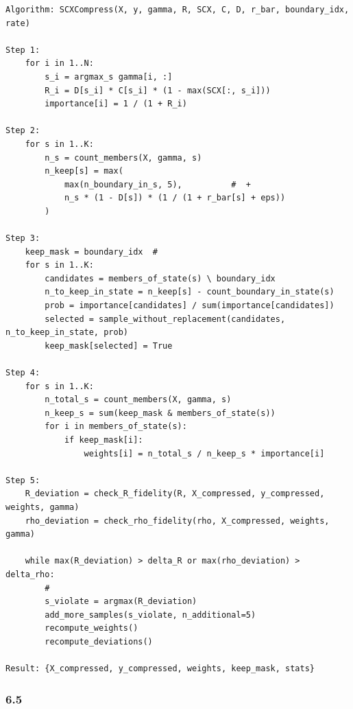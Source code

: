 \documentclass[
  12pt,
]{article}
\begin{document}
\begin{verbatim}
Algorithm: SCXCompress(X, y, gamma, R, SCX, C, D, r_bar, boundary_idx, rate)

Step 1: 
    for i in 1..N:
        s_i = argmax_s gamma[i, :]
        R_i = D[s_i] * C[s_i] * (1 - max(SCX[:, s_i]))
        importance[i] = 1 / (1 + R_i)

Step 2: 
    for s in 1..K:
        n_s = count_members(X, gamma, s)
        n_keep[s] = max(
            max(n_boundary_in_s, 5),          #  + 
            n_s * (1 - D[s]) * (1 / (1 + r_bar[s] + eps))
        )

Step 3: 
    keep_mask = boundary_idx  # 
    for s in 1..K:
        candidates = members_of_state(s) \ boundary_idx
        n_to_keep_in_state = n_keep[s] - count_boundary_in_state(s)
        prob = importance[candidates] / sum(importance[candidates])
        selected = sample_without_replacement(candidates, n_to_keep_in_state, prob)
        keep_mask[selected] = True

Step 4: 
    for s in 1..K:
        n_total_s = count_members(X, gamma, s)
        n_keep_s = sum(keep_mask & members_of_state(s))
        for i in members_of_state(s):
            if keep_mask[i]:
                weights[i] = n_total_s / n_keep_s * importance[i]

Step 5: 
    R_deviation = check_R_fidelity(R, X_compressed, y_compressed, weights, gamma)
    rho_deviation = check_rho_fidelity(rho, X_compressed, weights, gamma)

    while max(R_deviation) > delta_R or max(rho_deviation) > delta_rho:
        # 
        s_violate = argmax(R_deviation)
        add_more_samples(s_violate, n_additional=5)
        recompute_weights()
        recompute_deviations()

Result: {X_compressed, y_compressed, weights, keep_mask, stats}
\end{verbatim}

\subsubsection{6.5
}\label{ux4e0eux5176ux4ed6ux6a21ux5757ux7684ux534fux8c03-5}
\end{document}

